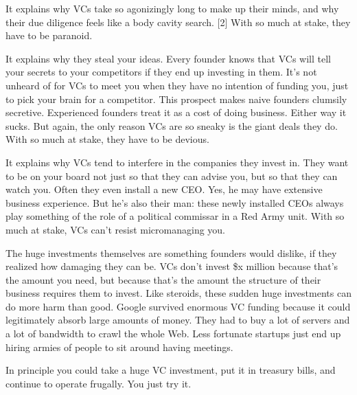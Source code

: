 It
                  explains why VCs take so agonizingly long to make up their
                  minds, and why their due diligence feels like a body cavity
                  search. [2] With so much at stake, they have to be
                  paranoid.

It explains why they steal your ideas.
                  Every founder knows that VCs will tell your secrets to your
                  competitors if they end up investing in them. It's not unheard
                  of for VCs to meet you when they have no intention of funding
                  you, just to pick your brain for a competitor. This prospect
                  makes naive founders clumsily secretive. Experienced founders
                  treat it as a cost of doing business. Either way it sucks. But
                  again, the only reason VCs are so sneaky is the giant deals
                  they do. With so much at stake, they have to be devious.

It
                  explains why VCs tend to interfere in the companies they
                  invest in. They want to be on your board not just so that they
                  can advise you, but so that they can watch you. Often they
                  even install a new CEO. Yes, he may have extensive business
                  experience. But he's also their man: these newly installed
                  CEOs always play something of the role of a political
                  commissar in a Red Army unit. With so much at stake, VCs can't
                  resist micromanaging you.

The huge investments
                  themselves are something founders would dislike, if they
                  realized how damaging they can be. VCs don't invest \$x million
                  because that's the amount you need, but because that's the
                  amount the structure of their business requires them to
                  invest. Like steroids, these sudden huge investments can do
                  more harm than good. Google survived enormous VC funding
                  because it could legitimately absorb large amounts of money.
                  They had to buy a lot of servers and a lot of bandwidth to
                  crawl the whole Web. Less fortunate startups just end up
                  hiring armies of people to sit around having meetings.

In
                  principle you could take a huge VC investment, put it in
                  treasury bills, and continue to operate frugally. You just try
                  it.


